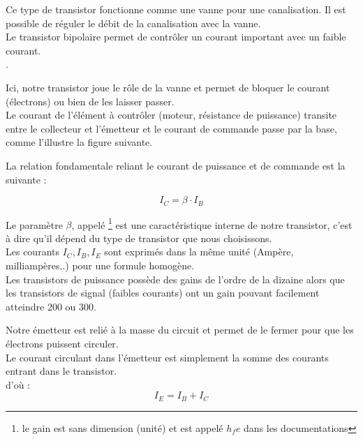 Ce type de transistor fonctionne comme une vanne pour une canalisation. Il est possible de réguler le débit de la canalisation avec la vanne.\\

Le transistor bipolaire permet de contrôler un courant important avec un faible courant.\\

.

Ici, notre transistor joue le rôle de la vanne et permet de bloquer le courant (électrons) ou bien de les laisser passer. \\


Le courant de l'élément à contrôler (moteur, résistance de puissance) transite entre le collecteur et l'émetteur et le courant de commande passe par la base, comme l'illustre la figure suivante.\\


La relation fondamentale reliant le courant de puissance et de commande est la suivante : 

$$ \boxed{ I_{C} = \beta \cdot I_{B} }$$

Le paramètre $\beta$, appelé \footnote{le gain est sans dimension (unité) et est appelé $ h_fe$ dans les documentations} est une caractéristique interne de notre transistor, c'est à dire qu'il dépend du type de transistor que nous choisissons.\\
Les courants $I_{C}, I_{B},I_{E}$ sont exprimés dans la même unité (Ampère, milliampères..) pour une formule homogène.\\

Les transistors de puissance possède des gains de l'ordre de la dizaine alors que les transistors de signal (faibles courants) ont un gain pouvant facilement atteindre 200 ou 300.



\begin{reponse}
  
  Notre émetteur est relié à la masse du circuit et permet de le fermer pour que les électrons puissent circuler.\\

  Le courant circulant dans l'émetteur est simplement la somme des courants entrant dans le transistor. \\
  d'où : $$ \boxed{ I_{E} = I_{B} + I_{C} }$$

  \end{reponse}



